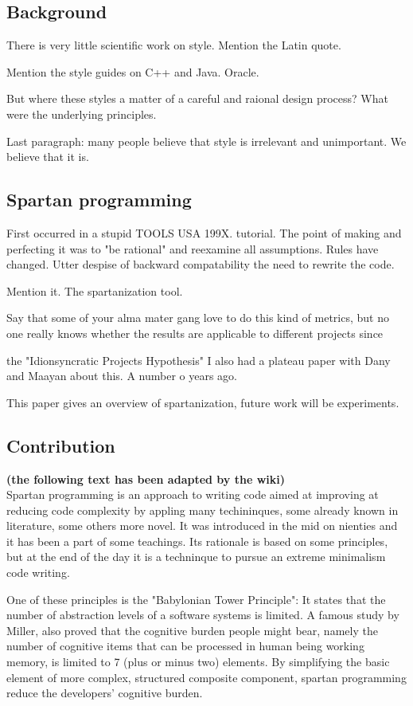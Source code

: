 \subsection{Background}
There is very little scientific work on style.
Mention the Latin quote.

Mention the style guides on C++ and Java. Oracle.

But where these styles a matter of a careful and raional design process?
What were the underlying principles.

Last paragraph: many people believe that style is irrelevant and unimportant. 
We believe that it is.

\subsection{Spartan programming}
First occurred in a stupid TOOLS USA 199X. tutorial.
The point of making and perfecting it was to "be rational" and 
reexamine all assumptions. 
Rules have changed.
Utter despise of backward compatability the need to rewrite the code.

Mention it.  The spartanization tool.

Say that some of your alma mater gang love to do this kind of metrics, but 
no one really knows whether the results are applicable to different projects
since 
\cite{Turnu:Concas:Marchesi:Tonelli:11}


the "Idionsyncratic Projects Hypothesis" I also had a plateau paper with 
Dany and Maayan about this. A number o years ago.


This paper gives an overview of spartanization, future work will be
experiments.

\subsection{Contribution}

\textbf{(the following text has been adapted by the wiki)}\\

Spartan programming is an approach to writing code aimed at improving at
reducing code complexity by appling many techininques, some already known in
literature, some others more novel. It was introduced in the mid on nienties
and it has been a part of some teachings.  Its rationale is based on some
principles, but at the end of the day it is a techninque to pursue an extreme
minimalism code writing.

One of these principles is the "Babylonian Tower Principle": It states that the
number of abstraction levels of a software systems is limited.  A famous study
by Miller, also proved that the cognitive burden people might bear, namely the
number of cognitive items that can be processed in human being working memory,
is limited to 7 (plus or minus two) elements. By simplifying the basic element
of more complex, structured composite component, spartan programming reduce the
developers' cognitive burden.

